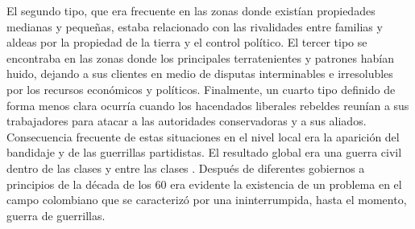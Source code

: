 \documentclass{article}
\begin{document}
El segundo tipo, que era frecuente en las zonas donde existían propiedades medianas y pequeñas, estaba relacionado con las rivalidades entre familias y aldeas por la propiedad de la tierra y el control político. El tercer tipo se encontraba en las zonas donde los principales terratenientes y patrones habían huido, dejando a sus clientes en medio de disputas interminables e irresolubles por los recursos económicos y políticos. Finalmente, un cuarto tipo definido de forma menos clara ocurría cuando los hacendados liberales rebeldes reunían a sus trabajadores para atacar a las autoridades conservadoras y a sus aliados. Consecuencia frecuente de estas situaciones en el nivel local era la aparición del bandidaje y de las guerrillas partidistas. El resultado global era una guerra civil dentro de las clases y entre las clases \cite{gower_general_1971}. Después de diferentes gobiernos a principios de la década de los 60 era evidente la existencia de un problema en el campo colombiano que se caracterizó por una ininterrumpida, hasta el momento, guerra de guerrillas. 



\renewcommand{\refname}{Bibliografia}

\end{document}
